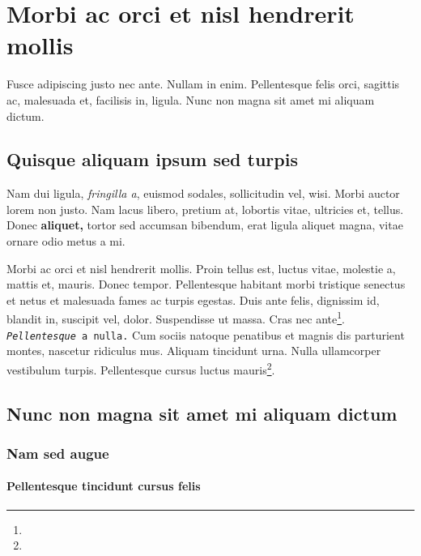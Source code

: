 \documentclass[cfonts]{nostarch}
\begin{document}
\chapter[Morbi ac orci]{Morbi ac orci et nisl hendrerit
  mollis}{} 

Fusce adipiscing justo nec ante. Nullam in enim.  Pellentesque felis
orci, sagittis ac, malesuada et, facilisis in, ligula. Nunc non magna
sit amet mi aliquam dictum.

\section{Quisque aliquam ipsum sed turpis}


Nam dui ligula, \emph{fringilla a}, euismod sodales, sollicitudin vel,
wisi.  Morbi auctor lorem non justo. Nam lacus libero, pretium at,
lobortis vitae, ultricies et, tellus. Donec \textbf{aliquet,} tortor
sed accumsan bibendum, erat ligula aliquet magna, vitae ornare odio
metus a mi.  

Morbi ac orci et nisl hendrerit mollis.  Proin tellus est, luctus
vitae, molestie a, mattis et, mauris. Donec tempor. Pellentesque
habitant morbi tristique senectus et netus et malesuada fames ac
turpis egestas. Duis ante felis, dignissim id, blandit in, suscipit
vel, dolor.  Suspendisse ut massa. Cras nec ante\footnote{\lipsum[4]}.
\texttt{{\itshape Pellentesque} a nulla.}  Cum sociis natoque
penatibus et magnis dis parturient montes, nascetur ridiculus mus.
Aliquam tincidunt urna.  Nulla ullamcorper vestibulum turpis.
Pellentesque cursus luctus mauris\footnote{\lipsum[3]}.

\lipsum[10]

\section{Nunc non magna sit amet mi aliquam dictum}

\lipsum[32-33]

\subsection{Nam sed augue}

\lipsum[34-35]

\subsubsection{Pellentesque tincidunt cursus felis}
\end{document}

